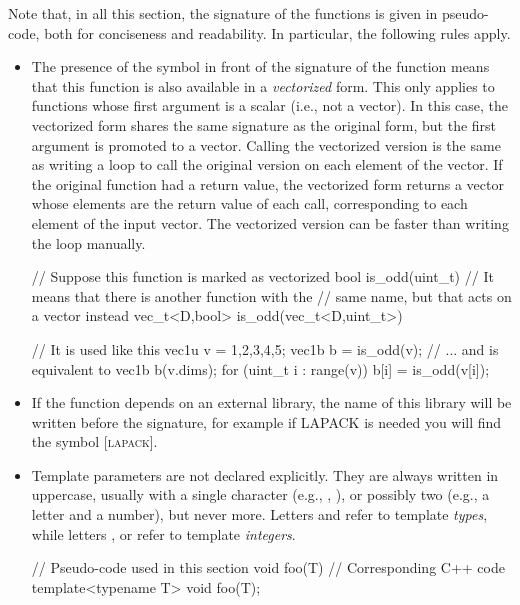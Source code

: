 \documentclass[12pt]{report}
\newcommand*\circled[1]{\tikz[baseline=(char.base)]{
            \node[shape=circle,draw,inner sep=0.0pt] (char) {#1};}}
\newcommand{\vectorfuncsym}{\circled{$\hspace{-1pt}\mathcal{V}$}\xspace}
\newcommand{\lapacksym}{\textsc{\small[lapack\small]}}
\newenvironment{example}
{
    \begin{mdframed}[style=example,frametitle={Example}]
}
{
    \end{mdframed}
}
\begin{document}
Note that, in all this section, the signature of the functions is given in pseudo-code, both for conciseness and readability. In particular, the following rules apply.

\begin{itemize}
\item The presence of the \vectorfuncsym symbol in front of the signature of the function means that this function is also available in a \emph{vectorized} form. This only applies to functions whose first argument is a scalar (i.e., not a vector). In this case, the vectorized form shares the same signature as the original form, but the first argument is promoted to a vector. Calling the vectorized version is the same as writing a loop to call the original version on each element of the vector. If the original function had a return value, the vectorized form returns a vector whose elements are the return value of each call, corresponding to each element of the input vector. The vectorized version can be faster than writing the loop manually.

\begin{example}
\begin{cppcode}
// Suppose this function is marked as vectorized
bool is_odd(uint_t)
// It means that there is another function with the
// same name, but that acts on a vector instead
vec_t<D,bool> is_odd(vec_t<D,uint_t>)

// It is used like this
vec1u v = {1,2,3,4,5};
vec1b b = is_odd(v);
// ... and is equivalent to
vec1b b(v.dims);
for (uint_t i : range(v)) {
    b[i] = is_odd(v[i]);
}
\end{cppcode}
\end{example}

\item If the function depends on an external library, the name of this library will be written before the signature, for example if LAPACK is needed you will find the symbol \lapacksym.

\item Template parameters are not declared explicitly. They are always written in uppercase, usually with a single character (e.g., , ), or possibly two (e.g., a letter and a number), but never more. Letters  and  refer to template \emph{types}, while letters ,  or  refer to template \emph{integers}.

\begin{example}
\begin{cppcode}
// Pseudo-code used in this section
void foo(T)
// Corresponding C++ code
template<typename T>
void foo(T);


\end{cppcode}
\end{example}
\end{itemize}
\end{document}
